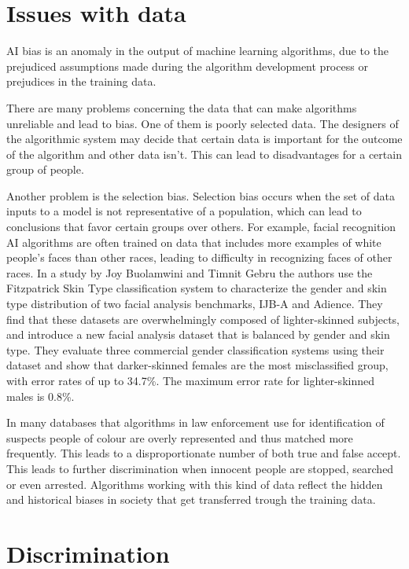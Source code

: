 \documentclass[
	12pt,
    a4paper,
    egregdoesnotlikesansseriftitles, %
    toc=chapterentrywithdots,
    oneside, openany,
    titlepage,
    parskip=half,
    headings=normal,  %
    listof=totoc,
    bibliography=totocnumbered,
    index=totoc,
    captions=tableheading,  %
    listof=flat,
    numbers=noenddot, %
    final]
    {scrbook}
\begin{document}
\chapter{Issues with data}
AI bias is an anomaly in the output of machine learning algorithms, due to the prejudiced assumptions made during the algorithm development process or prejudices in the training data.
 
There are many problems concerning the data that can make algorithms unreliable and lead to bias.
One of them is poorly selected data.
The designers of the algorithmic system may decide that certain data is important for the outcome of the algorithm and other data isn't.
This can lead to disadvantages for a certain group of people. \cite[p. 7]{usa}


Another problem is the selection bias.
Selection bias occurs when the set of data inputs to a model is not representative of a population, which can lead to conclusions that favor certain groups over others. \cite[p. 8]{usa}
For example, facial recognition AI algorithms are often trained on data that includes more examples of white people's faces than other races, leading to difficulty in recognizing faces of other races.
In a study by Joy Buolamwini and Timnit Gebru the authors use the Fitzpatrick Skin Type classification system to characterize the gender and skin type distribution of two facial analysis benchmarks, IJB-A and Adience. 
They find that these datasets are overwhelmingly composed of lighter-skinned subjects, and introduce a new facial analysis dataset that is balanced by gender and skin type. 
They evaluate three commercial gender classification systems using their dataset and show that darker-skinned females are the most misclassified group, with error rates of up to 34.7\%. 
The maximum error rate for lighter-skinned males is 0.8\%. 
\cite[p. 1]{buolamwini_gender_2018}

In many databases that algorithms in law enforcement use for identification of suspects people of colour are overly represented and thus matched more frequently. 
This leads to a disproportionate number of both true and false accept. \cite[p. 323-324]{bacchini_race_2019}
This leads to further discrimination when innocent people are stopped, searched or even arrested.
Algorithms working with this kind of data reflect the hidden and historical biases in society that get transferred trough the training data. \cite[p. 8]{usa}



\chapter{Discrimination}
\end{document}

